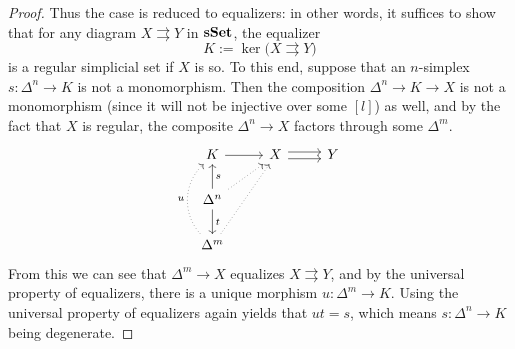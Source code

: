 \documentclass[a4paper,11pt,openany]{scrartcl}
\begin{document}
\begin{proof}
Thus the case is reduced to equalizers: in other words, it suffices to show that for any diagram $X\rightrightarrows Y$ in $\operatorname{\mathbf{sSet}}$, the equalizer
\[
K:=\ker\big(X\rightrightarrows Y\big)
\]
is a regular simplicial set if $X$ is so. To this end, suppose that an $n$-simplex $s\colon\Delta^n\to K$ is not a monomorphism. Then the composition $\Delta^n\to K\to X$ is not a monomorphism (since it will not be injective over some $[l]$) as well, and by the fact that $X$ is regular, the composite $\Delta^n\to X$ factors through some $\Delta^m$.
\[
\begin{tikzcd}
K\arrow[r]& X\arrow[r,shift right]\arrow[r,shift left]& Y\\
\Delta^n\arrow[u,"s"']\arrow[ur,dotted]\arrow[d,"t"]&&\\
\Delta^m\arrow[uur,dotted]\arrow[uu,bend left=45,dotted,"u"]&&
\end{tikzcd}
\]
From this we can see that $\Delta^m\to X$ equalizes $X\rightrightarrows Y$, and by the universal property of equalizers, there is a unique morphism $u\colon\Delta^m\to K$. Using the universal property of equalizers again yields that $ut=s$, which means $s\colon\Delta^n\to K$ being degenerate.
\end{proof}
\end{document}
